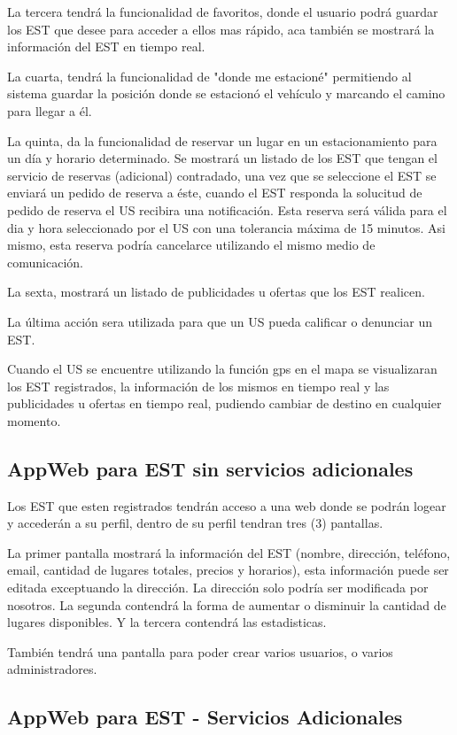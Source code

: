 \documentclass[spanish, DIV=calc, paper=a4, fontsize=11pt, twocolumn]{scrartcl}	 %
\begin{document}
La tercera tendrá la funcionalidad de favoritos, donde el usuario podrá guardar los EST que desee para acceder a ellos mas rápido, aca	también se mostrará la información del EST en tiempo real.
				
La cuarta, tendrá la funcionalidad de "donde me estacioné" permitiendo al sistema guardar la posición donde se estacionó el vehículo y marcando el camino para llegar a él. 	

La quinta, da la funcionalidad de reservar un lugar en un estacionamiento para un día y horario determinado. Se mostrará un listado de los EST que tengan el servicio de reservas (adicional) contradado, una vez que se seleccione el EST se enviará un pedido de reserva a éste, cuando el EST responda la solucitud de pedido de reserva el US recibira una notificación. Esta reserva será válida para el dia y hora seleccionado	por el US con una tolerancia máxima de 15 minutos. Asi mismo, esta reserva podría cancelarce utilizando el mismo medio de comunicación.

La sexta, mostrará un listado de publicidades u ofertas que los EST realicen.

La última acción sera utilizada para que un US pueda calificar o denunciar un EST.

Cuando el US se encuentre utilizando la función gps en el mapa se visualizaran los EST registrados, la información de los mismos en tiempo real y las publicidades u ofertas en tiempo real, pudiendo cambiar de destino en cualquier momento.

\subsection{AppWeb para EST sin servicios adicionales}
Los EST que esten registrados tendrán acceso a una web donde se podrán logear y accederán a su perfil, dentro de su perfil tendran tres (3) pantallas.


La primer pantalla mostrará la información del EST (nombre, dirección,  teléfono, email, cantidad de lugares totales, precios y horarios), esta información puede ser editada exceptuando la dirección. La dirección solo podría ser modificada por nosotros.	La segunda contendrá la forma de aumentar o disminuir la cantidad de lugares disponibles. Y la tercera contendrá las estadisticas.

También tendrá una pantalla para poder crear varios usuarios, o varios administradores.


\subsection{AppWeb para EST - Servicios Adicionales}
\end{document}

